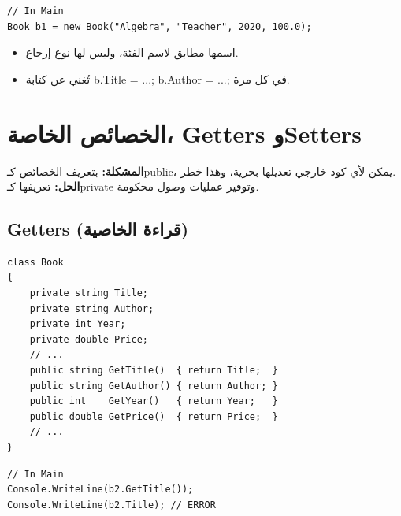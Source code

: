 \documentclass[14pt]{extarticle}
\begin{document}
\begin{boxExample}
\begin{english}
\begin{verbatim}
// In Main
Book b1 = new Book("Algebra", "Teacher", 2020, 100.0);
\end{verbatim}
\end{english}
\end{boxExample}

\begin{itemize}[itemsep=1pt]
    \item اسمها مطابق لاسم الفئة، وليس لها نوع إرجاع.
    \item تُغني عن كتابة \textenglish{b.Title = ...; b.Author = ...;} في كل مرة.
\end{itemize}

\clearpage
\section{الخصائص الخاصة، \textenglish{Getters} و\textenglish{Setters}}

\begin{boxAttention}
\textbf{المشكلة:} بتعريف الخصائص كـ\textenglish{public}، يمكن لأي كود خارجي تعديلها بحرية، وهذا خطر.\\
\textbf{الحل:} تعريفها كـ\textenglish{private} وتوفير عمليات وصول محكومة.
\end{boxAttention}

\subsection{\textenglish{Getters} (قراءة الخاصية)}

\begin{boxExample}
\begin{english}
\begin{verbatim}
class Book
{
    private string Title;
    private string Author;
    private int Year;
    private double Price;
    // ...
    public string GetTitle()  { return Title;  }
    public string GetAuthor() { return Author; }
    public int    GetYear()   { return Year;   }
    public double GetPrice()  { return Price;  }
    // ...
}
\end{verbatim}
\end{english}
\end{boxExample}

\begin{boxExample}
\begin{english}
\begin{verbatim}
// In Main
Console.WriteLine(b2.GetTitle());
Console.WriteLine(b2.Title); // ERROR
\end{verbatim}
\end{english}
\end{boxExample}
\end{document}
